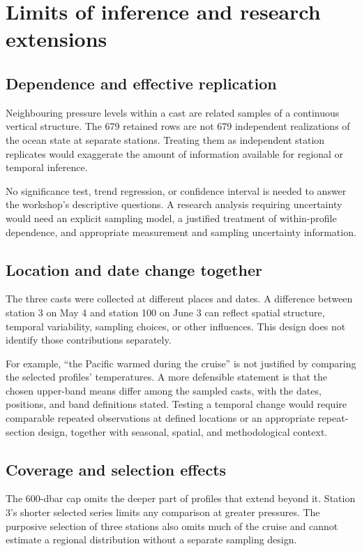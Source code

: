 \documentclass[11pt,letterpaper]{article}
\begin{document}
\section{Limits of inference and research extensions}
\label{sec:limitations}

\subsection{Dependence and effective replication}
Neighbouring pressure levels within a cast are related samples of a continuous vertical structure. The 679 retained rows are not 679 independent realizations of the ocean state at separate stations. Treating them as independent station replicates would exaggerate the amount of information available for regional or temporal inference.

No significance test, trend regression, or confidence interval is needed to answer the workshop's descriptive questions. A research analysis requiring uncertainty would need an explicit sampling model, a justified treatment of within-profile dependence, and appropriate measurement and sampling uncertainty information.

\subsection{Location and date change together}
The three casts were collected at different places and dates. A difference between station 3 on May 4 and station 100 on June 3 can reflect spatial structure, temporal variability, sampling choices, or other influences. This design does not identify those contributions separately.

For example, ``the Pacific warmed during the cruise'' is not justified by comparing the selected profiles' temperatures. A more defensible statement is that the chosen upper-band means differ among the sampled casts, with the dates, positions, and band definitions stated. Testing a temporal change would require comparable repeated observations at defined locations or an appropriate repeat-section design, together with seasonal, spatial, and methodological context.

\subsection{Coverage and selection effects}
The 600-dbar cap omits the deeper part of profiles that extend beyond it. Station 3's shorter selected series limits any comparison at greater pressures. The purposive selection of three stations also omits much of the cruise and cannot estimate a regional distribution without a separate sampling design.
\end{document}
